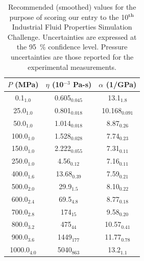 \documentclass[preprint,review,12pt]{elsarticle}
\begin{document}
	
	
	\begin{table}[htb!]
		\caption{Recommended (smoothed) values for the purpose of scoring our entry to the 10$^{\rm th}$ Industrial Fluid Properties Simulation Challenge. Uncertainties are expressed at the 95~\% confidence level. Pressure uncertainties are those reported for the experimental measurements.} \label{tab:smoothed_values}
		\begin{center}
			\begin{tabular}{|c|c|c|}
				\hline
				$P$ (MPa) & 	$\eta$ (10$^{-3}$ Pa-s) & 	$\alpha$ (1/GPa) \\ \hline
				0.1$_{1.0}$ & 	0.605$_{0.045}$ & 	13.1$_{1.8}$ \\
				25.0$_{1.0}$ & 	0.801$_{0.018}$ & 	10.168$_{0.091}$ \\
				50.0$_{1.0}$ & 	1.014$_{0.018}$ & 	8.87$_{0.26}$ \\
				100.0$_{1.0}$ & 	1.528$_{0.028}$ & 	7.74$_{0.23}$ \\
				150.0$_{1.0}$ & 	2.222$_{0.055}$ & 	7.31$_{0.11}$ \\
				250.0$_{1.0}$ & 	4.56$_{0.12}$ & 	7.16$_{0.11}$ \\
				400.0$_{1.6}$ & 	13.68$_{0.39}$ & 	7.59$_{0.21}$ \\
				500.0$_{2.0}$ & 	29.9$_{1.5}$ & 	8.10$_{0.22}$ \\
				600.0$_{2.4}$ & 	69.5$_{4.8}$ & 	8.77$_{0.18}$ \\
				700.0$_{2.8}$ & 	174$_{15}$ & 	9.58$_{0.20}$ \\
				800.0$_{3.2}$ & 	475$_{44}$ & 	10.57$_{0.41}$ \\
				900.0$_{3.6}$ & 	1449$_{177}$ & 	11.77$_{0.78}$ \\
				1000.0$_{4.0}$ & 	5040$_{863}$ & 	13.2$_{1.1}$ \\
				

\end{tabular}
\end{center}
\end{table}
\end{document}
